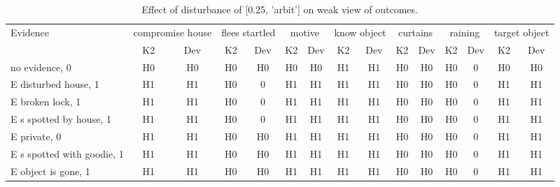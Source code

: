 \begin{table}\begin{tabular}{l|cc|cc|cc|cc|cc|cc|cc}\toprule\multirow{2}{*}{Evidence} & \multicolumn{2}{c}{compromise house}& \multicolumn{2}{c}{flees startled}& \multicolumn{2}{c}{motive}& \multicolumn{2}{c}{know object}& \multicolumn{2}{c}{curtains}& \multicolumn{2}{c}{raining}& \multicolumn{2}{c}{target object}\\& {K2} & {Dev}& {K2} & {Dev}& {K2} & {Dev}& {K2} & {Dev}& {K2} & {Dev}& {K2} & {Dev}& {K2} & {Dev}\\\midrule
no evidence, 0 & H0&H0&H0&H0&H0&H0&H1&H1&H0&H0&\cellcolor{Bittersweet}H0&\cellcolor{Bittersweet}0&H0&H0\\E disturbed house, 1 & H1&H1&\cellcolor{Bittersweet}H0&\cellcolor{Bittersweet}0&H1&H1&H1&H1&H0&H0&\cellcolor{Bittersweet}H0&\cellcolor{Bittersweet}0&H1&H1\\E broken lock, 1 & H1&H1&\cellcolor{Bittersweet}H0&\cellcolor{Bittersweet}0&H1&H1&H1&H1&H0&H0&\cellcolor{Bittersweet}H0&\cellcolor{Bittersweet}0&H1&H1\\E s spotted by house, 1 & H1&H1&\cellcolor{Bittersweet}H0&\cellcolor{Bittersweet}0&H1&H1&H1&H1&H0&H0&\cellcolor{Bittersweet}H0&\cellcolor{Bittersweet}0&H1&H1\\E private, 0 & H1&H1&H0&H0&H1&H1&H1&H1&H0&H0&\cellcolor{Bittersweet}H0&\cellcolor{Bittersweet}0&H1&H1\\E s spotted with goodie, 1 & H1&H1&H0&H0&H1&H1&H1&H1&H0&H0&\cellcolor{Bittersweet}H0&\cellcolor{Bittersweet}0&H1&H1\\E object is gone, 1 & H1&H1&H0&H0&H1&H1&H1&H1&H0&H0&\cellcolor{Bittersweet}H0&\cellcolor{Bittersweet}0&H1&H1\\\bottomrule\end{tabular}\caption{Effect of disturbance of [0.25, 'arbit'] on weak view of outcomes.}\end{table}
